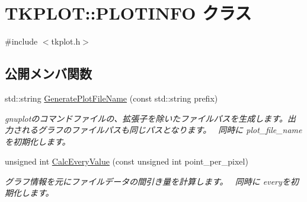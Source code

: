 \hypertarget{class_t_k_p_l_o_t_1_1_p_l_o_t_i_n_f_o}{}\section{T\+K\+P\+L\+OT\+:\+:P\+L\+O\+T\+I\+N\+FO クラス}
\label{class_t_k_p_l_o_t_1_1_p_l_o_t_i_n_f_o}


{\ttfamily \#include $<$tkplot.\+h$>$}

\subsection*{公開メンバ関数}
\begin{DoxyCompactItemize}
\item 
std\+::string \hyperlink{class_t_k_p_l_o_t_1_1_p_l_o_t_i_n_f_o_aa5593f16a8756e42b0ba5e82f79ffd11}{Generate\+Plot\+File\+Name} (const std\+::string prefix)
\begin{DoxyCompactList}\small\item\em gnuplotのコマンドファイルの、拡張子を除いたファイルパスを生成します。出力されるグラフのファイルパスも同じパスとなります。~\newline
同時に plot\+\_\+file\+\_\+nameを初期化します。 \end{DoxyCompactList}\item 
unsigned int \hyperlink{class_t_k_p_l_o_t_1_1_p_l_o_t_i_n_f_o_aba014d5ce5807ab0e1c1a2bfb2aca7dd}{Calc\+Every\+Value} (const unsigned int point\+\_\+per\+\_\+pixel)
\begin{DoxyCompactList}\small\item\em グラフ情報を元にファイルデータの間引き量を計算します。~\newline
同時に everyを初期化します。 \end{DoxyCompactList}\end{DoxyCompactItemize}
